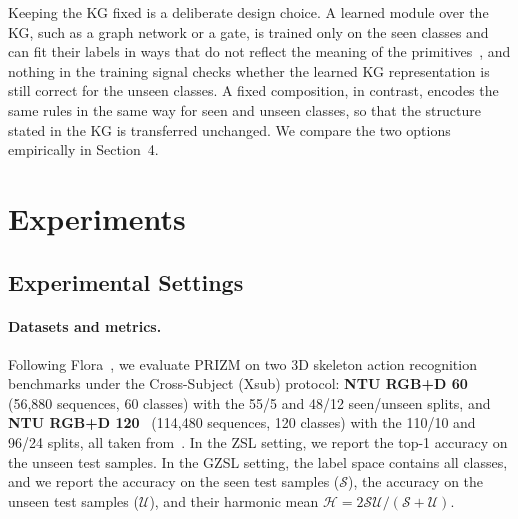 \documentclass[11pt]{article}
\begin{document}
Keeping the KG fixed is a deliberate design choice. A learned module over the KG, such as a graph network or a gate, is trained only on the seen classes and can fit their labels in ways that do not reflect the meaning of the primitives~\cite{marconato26,andolfi25}, and nothing in the training signal checks whether the learned KG representation is still correct for the unseen classes. A fixed composition, in contrast, encodes the same rules in the same way for seen and unseen classes, so that the structure stated in the KG is transferred unchanged. We compare the two options empirically in Section~4.

\section{Experiments}
\label{sec:exp}

\subsection{Experimental Settings}

\paragraph{Datasets and metrics.}
Following Flora~\cite{flora26}, we evaluate PRIZM on two 3D skeleton action recognition benchmarks under the Cross-Subject (Xsub) protocol: \textbf{NTU RGB+D 60}~\cite{ntu60} (56,880 sequences, 60 classes) with the 55/5 and 48/12 seen/unseen splits, and \textbf{NTU RGB+D 120}~\cite{ntu120} (114,480 sequences, 120 classes) with the 110/10 and 96/24 splits, all taken from~\cite{synse21}. In the ZSL setting, we report the top-1 accuracy on the unseen test samples. In the GZSL setting, the label space contains all classes, and we report the accuracy on the seen test samples ($\mathcal{S}$), the accuracy on the unseen test samples ($\mathcal{U}$), and their harmonic mean $\mathcal{H} = 2\mathcal{S}\mathcal{U}/(\mathcal{S} + \mathcal{U})$.
\end{document}
